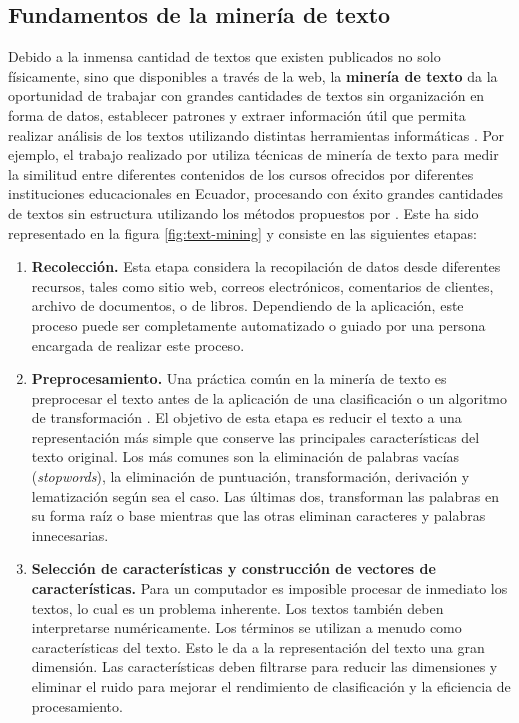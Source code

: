 \subsection{Fundamentos de la minería de texto}

Debido a la inmensa cantidad de textos que existen publicados no solo físicamente, sino que disponibles a través de la web, la \textbf{minería de texto} da la oportunidad de trabajar con grandes cantidades de textos sin organización en forma de datos, establecer patrones y extraer información útil que permita realizar análisis de los textos utilizando distintas herramientas informáticas \citep{BIBLIO2007}. Por ejemplo, el trabajo realizado por \citet{orellana2018text} utiliza técnicas de minería de texto para medir la similitud entre diferentes contenidos de los cursos ofrecidos por diferentes instituciones educacionales en Ecuador, procesando con éxito grandes cantidades de textos sin estructura utilizando los métodos propuestos por \citet{carnerud2017exploring}. Este ha sido representado en la figura \ref{fig:text-mining} y consiste en las siguientes etapas:

 \begin{enumerate}
    \item \textbf{Recolección.} Esta etapa considera la recopilación de datos desde diferentes recursos, tales como sitio web, correos electrónicos, comentarios de clientes, archivo de documentos, o de libros. Dependiendo de la aplicación, este proceso puede ser completamente automatizado o guiado por una persona encargada de realizar este proceso.
    
    \item \textbf{Preprocesamiento.} Una práctica común en la minería de texto es preprocesar el texto antes de la aplicación de una clasificación o un algoritmo de transformación \citep{allahyari2017brief}. El objetivo de esta etapa es reducir el texto a una representación más simple que conserve las principales características del texto original. Los más comunes son la eliminación de palabras vacías (\textit{stopwords}), la eliminación de puntuación, transformación, derivación y lematización según sea el caso. Las últimas dos, transforman las palabras en su forma raíz o base mientras que las otras eliminan caracteres y palabras innecesarias.

    \item \textbf{Selección de características y construcción de vectores de características.} Para un computador es imposible procesar de inmediato los textos, lo cual es un problema inherente. Los textos también deben interpretarse numéricamente. Los términos se utilizan a menudo como características del texto. Esto le da a la representación del texto una gran dimensión. Las características deben filtrarse para reducir las dimensiones y eliminar el ruido para mejorar el rendimiento de clasificación y la eficiencia de procesamiento.
 \end{enumerate}

